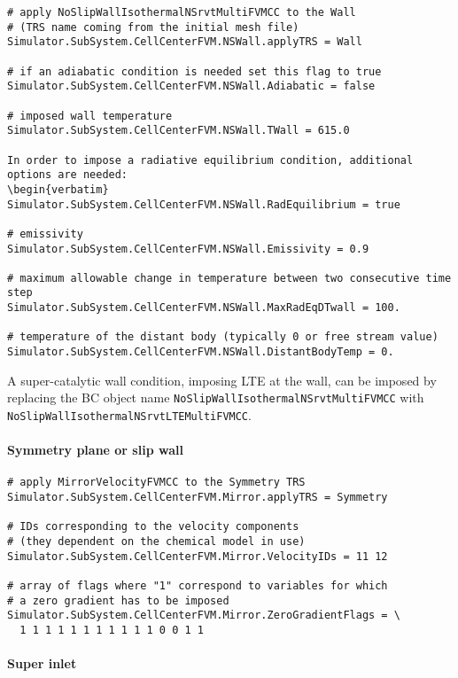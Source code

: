 \documentclass[11pt]{article}
\begin{document}
\begin{verbatim}
# apply NoSlipWallIsothermalNSrvtMultiFVMCC to the Wall
# (TRS name coming from the initial mesh file)
Simulator.SubSystem.CellCenterFVM.NSWall.applyTRS = Wall

# if an adiabatic condition is needed set this flag to true
Simulator.SubSystem.CellCenterFVM.NSWall.Adiabatic = false

# imposed wall temperature
Simulator.SubSystem.CellCenterFVM.NSWall.TWall = 615.0

In order to impose a radiative equilibrium condition, additional options are needed:
\begin{verbatim}
Simulator.SubSystem.CellCenterFVM.NSWall.RadEquilibrium = true

# emissivity
Simulator.SubSystem.CellCenterFVM.NSWall.Emissivity = 0.9

# maximum allowable change in temperature between two consecutive time step
Simulator.SubSystem.CellCenterFVM.NSWall.MaxRadEqDTwall = 100.

# temperature of the distant body (typically 0 or free stream value)
Simulator.SubSystem.CellCenterFVM.NSWall.DistantBodyTemp = 0.
\end{verbatim}

A super-catalytic wall condition, imposing LTE at the wall, can be imposed by replacing 
the BC object name {\tt NoSlipWallIsothermalNSrvtMultiFVMCC} with 
{\tt NoSlipWallIsothermalNSrvtLTEMultiFVMCC}. 

\paragraph{Symmetry plane or slip wall}

\begin{verbatim}
# apply MirrorVelocityFVMCC to the Symmetry TRS 
Simulator.SubSystem.CellCenterFVM.Mirror.applyTRS = Symmetry

# IDs corresponding to the velocity components 
# (they dependent on the chemical model in use)
Simulator.SubSystem.CellCenterFVM.Mirror.VelocityIDs = 11 12

# array of flags where "1" correspond to variables for which 
# a zero gradient has to be imposed
Simulator.SubSystem.CellCenterFVM.Mirror.ZeroGradientFlags = \
  1 1 1 1 1 1 1 1 1 1 1 0 0 1 1
\end{verbatim}

\paragraph{Super inlet}
\end{document}
